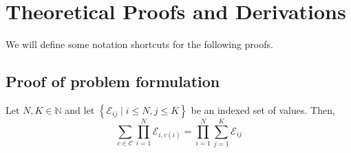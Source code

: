 \chapter{Theoretical Proofs and Derivations}\label{sec:appendix_theory}

We will define some notation shortcuts for the following proofs.

\section{Proof of problem formulation}\label{sec:proofs}

\begin{lemma} 
    
    Let $N, K \in \mathbb{N}$ and let $\left\{\mathcal{E}_{i j} \mid i \leq N, j \leq K\right\}$ be an indexed set of values. Then,
    $$
    \sum_{c \in \mathcal{C}} \prod_{i=1}^N \mathcal{E}_{i, c(i)}=\prod_{i=1}^N \sum_{j=1}^K \mathcal{E}_{i j}
    $$
\end{lemma}

